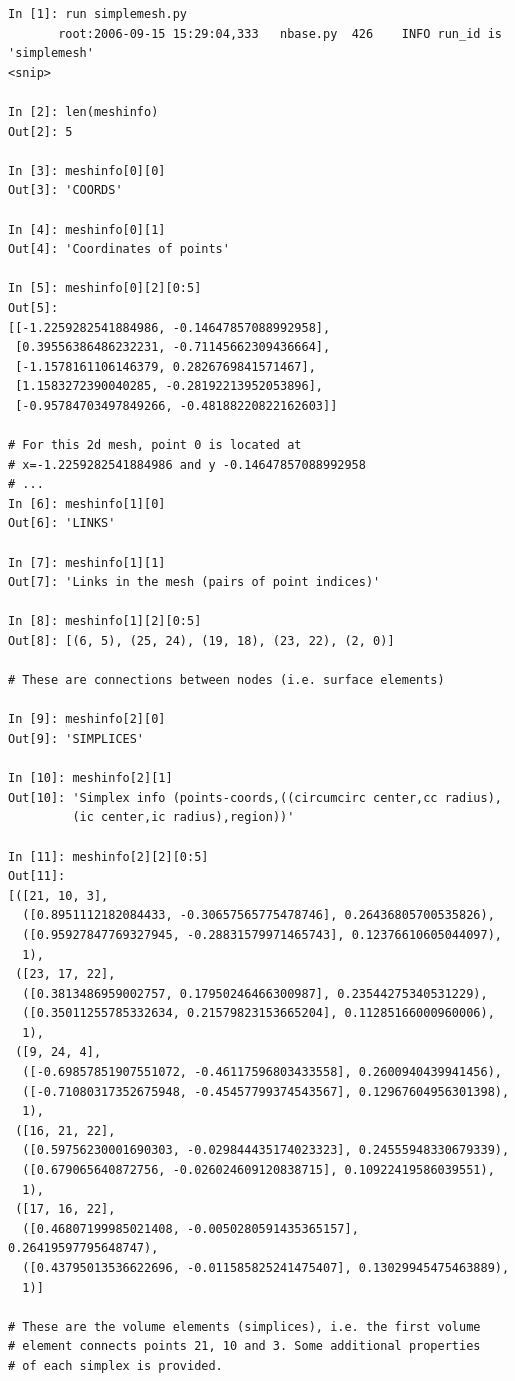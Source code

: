 \documentclass[10pt,a4paper]{book}
\begin{document}
\begin{lstlisting}
In [1]: run simplemesh.py
       root:2006-09-15 15:29:04,333   nbase.py  426    INFO run_id is 'simplemesh'
<snip>
 
In [2]: len(meshinfo)
Out[2]: 5

In [3]: meshinfo[0][0]
Out[3]: 'COORDS'

In [4]: meshinfo[0][1]
Out[4]: 'Coordinates of points'

In [5]: meshinfo[0][2][0:5]
Out[5]: 
[[-1.2259282541884986, -0.14647857088992958],
 [0.39556386486232231, -0.71145662309436664],
 [-1.1578161106146379, 0.2826769841571467],
 [1.1583272390040285, -0.28192213952053896],
 [-0.95784703497849266, -0.48188220822162603]]

# For this 2d mesh, point 0 is located at 
# x=-1.2259282541884986 and y -0.14647857088992958 
# ...
In [6]: meshinfo[1][0]
Out[6]: 'LINKS'

In [7]: meshinfo[1][1]
Out[7]: 'Links in the mesh (pairs of point indices)'

In [8]: meshinfo[1][2][0:5]
Out[8]: [(6, 5), (25, 24), (19, 18), (23, 22), (2, 0)]

# These are connections between nodes (i.e. surface elements)

In [9]: meshinfo[2][0]
Out[9]: 'SIMPLICES'

In [10]: meshinfo[2][1]
Out[10]: 'Simplex info (points-coords,((circumcirc center,cc radius),
         (ic center,ic radius),region))'

In [11]: meshinfo[2][2][0:5]
Out[11]: 
[([21, 10, 3],
  ([0.8951112182084433, -0.30657565775478746], 0.26436805700535826),
  ([0.95927847769327945, -0.28831579971465743], 0.12376610605044097),
  1),
 ([23, 17, 22],
  ([0.3813486959002757, 0.17950246466300987], 0.23544275340531229),
  ([0.35011255785332634, 0.21579823153665204], 0.11285166000960006),
  1),
 ([9, 24, 4],
  ([-0.69857851907551072, -0.46117596803433558], 0.2600940439941456),
  ([-0.71080317352675948, -0.45457799374543567], 0.12967604956301398),
  1),
 ([16, 21, 22],
  ([0.59756230001690303, -0.029844435174023323], 0.24555948330679339),
  ([0.679065640872756, -0.026024609120838715], 0.10922419586039551),
  1),
 ([17, 16, 22],
  ([0.46807199985021408, -0.0050280591435365157], 0.26419597795648747),
  ([0.43795013536622696, -0.011585825241475407], 0.13029945475463889),
  1)]

# These are the volume elements (simplices), i.e. the first volume 
# element connects points 21, 10 and 3. Some additional properties 
# of each simplex is provided.


\end{lstlisting}
\end{document}
